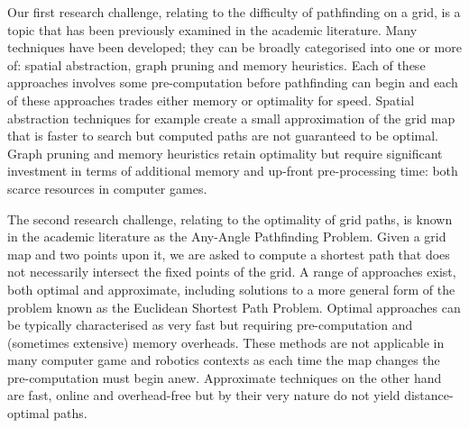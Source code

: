 Our first research challenge, relating to the difficulty of pathfinding on a grid,
is a topic that has been previously examined in the academic literature. 
Many techniques have been developed; they can be broadly categorised into
one or more of: spatial abstraction, graph
pruning  and memory heuristics. Each of these approaches involves some
pre-computation before pathfinding can begin and each of these approaches
trades either memory or optimality for speed. Spatial abstraction techniques
for example create a small approximation of the grid map that is faster to
search but computed paths are not guaranteed to be optimal. Graph pruning and 
memory heuristics retain optimality but require significant investment in terms 
of additional memory and up-front pre-processing time: both scarce resources
in computer games.

The second research challenge, relating to the optimality of grid paths,
is known in the academic literature as the Any-Angle Pathfinding Problem. 
Given a grid map and two points upon it, we are asked to compute a shortest path 
that does not necessarily intersect the fixed points of the grid.
A range of approaches exist, both optimal and approximate, 
including solutions to a more general form of the problem known as the 
Euclidean Shortest Path Problem.
Optimal approaches can be typically characterised as very fast but requiring
pre-computation and (sometimes extensive) memory overheads. 
These methods are not applicable in many computer game and robotics contexts as 
each time the map changes the pre-computation must begin anew.
Approximate techniques on the other hand are fast, online and overhead-free but 
by their very nature do not yield distance-optimal paths.

